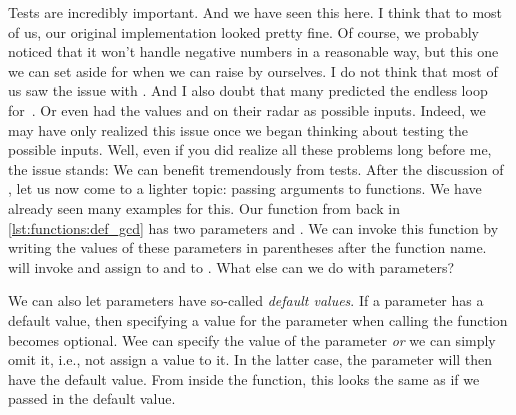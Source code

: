 Tests are incredibly important.
And we have seen this here.
I think that to most of us, our original  implementation looked pretty fine.
Of course, we probably noticed that it won't handle negative numbers in a reasonable way, but this one we can set aside for when we can raise  by ourselves.
I do not think that most of us saw the issue with .
And I also doubt that many predicted the endless loop for~.
Or even had the values  and  on their radar as possible inputs.
Indeed, we may have only realized this issue once we began thinking about testing the possible inputs.
Well, even if you did realize all these problems long before me, the issue stands:
We can benefit tremendously from tests.%
%
\FloatBarrier%
\endhsection%
%
%
\FloatBarrier%
%
%
%
%
%
%
%
After the discussion of , let us now come to a lighter topic: passing arguments to functions.
We have already seen many examples for this.
Our  function from back in \cref{lst:functions:def_gcd} has two parameters  and .
We can invoke this function by writing the values of these parameters in parentheses after the function name.
 will invoke  and assign  to  and  to .
What else can we do with parameters?

We can also let parameters have so-called \emph{default values}.
If a parameter has a default value, then specifying a value for the parameter when calling the function becomes optional.
Wee can specify the value of the parameter \emph{or} we can simply omit it, i.e., not assign a value to it.
In the latter case, the parameter will then have the default value.
From inside the function, this looks the same as if we passed in the default value.


